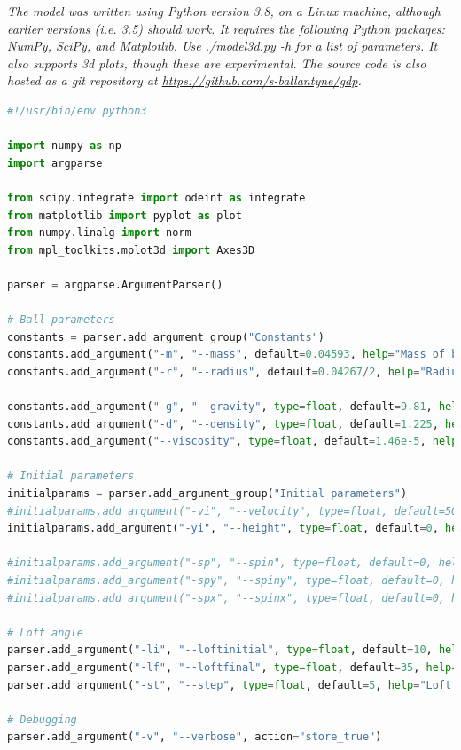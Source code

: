 \documentclass[12pt]{article}
\begin{document}
\textit{The model was written using Python version 3.8, on a Linux machine, although earlier versions (i.e. 3.5) should work. It requires the following Python packages: NumPy, SciPy, and Matplotlib. Use ./model3d.py -h for a list of parameters. It also supports 3d plots, though these are experimental. The source code is also hosted as a git repository at \url{https://github.com/s-ballantyne/gdp}.}
\begin{lstlisting}[language=Python, caption=Python model), style=PythonStyle, basicstyle=\tiny]
#!/usr/bin/env python3

import numpy as np
import argparse

from scipy.integrate import odeint as integrate
from matplotlib import pyplot as plot
from numpy.linalg import norm
from mpl_toolkits.mplot3d import Axes3D

parser = argparse.ArgumentParser()

# Ball parameters
constants = parser.add_argument_group("Constants")
constants.add_argument("-m", "--mass", default=0.04593, help="Mass of ball (kg)")
constants.add_argument("-r", "--radius", default=0.04267/2, help="Radius of ball (m)")

constants.add_argument("-g", "--gravity", type=float, default=9.81, help="For when we get a Mars base (m/s/s)")
constants.add_argument("-d", "--density", type=float, default=1.225, help="Density of air (kg m^-3)")
constants.add_argument("--viscosity", type=float, default=1.46e-5, help="Kinematic viscosity of air")

# Initial parameters
initialparams = parser.add_argument_group("Initial parameters")
#initialparams.add_argument("-vi", "--velocity", type=float, default=50, help="Initial velocity (m/s)")
initialparams.add_argument("-yi", "--height", type=float, default=0, help="Initial height (m)")

#initialparams.add_argument("-sp", "--spin", type=float, default=0, help="Spin (z)")
#initialparams.add_argument("-spy", "--spiny", type=float, default=0, help="Spin (y)")
#initialparams.add_argument("-spx", "--spinx", type=float, default=0, help="Spin (x)")

# Loft angle
parser.add_argument("-li", "--loftinitial", type=float, default=10, help="Loft angle (initial)")
parser.add_argument("-lf", "--loftfinal", type=float, default=35, help="Loft angle (final)")
parser.add_argument("-st", "--step", type=float, default=5, help="Loft angle (step)")

# Debugging
parser.add_argument("-v", "--verbose", action="store_true")


\end{lstlisting}
\end{document}
